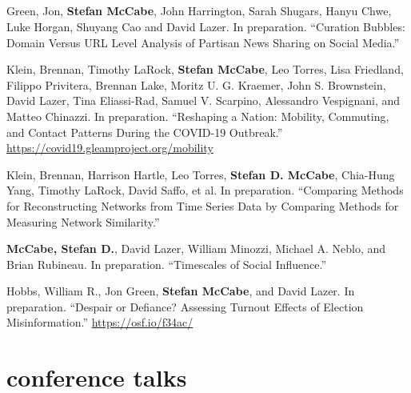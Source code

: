 \documentclass[11pt, letter]{article}
\begin{document}
\subsection*{} %
\vspace{-6mm} %
\begin{hangparas}{.25in}{1}
Green, Jon, \textbf{Stefan McCabe}, John Harrington, Sarah Shugars, Hanyu
Chwe, Luke Horgan, Shuyang Cao and David Lazer. In preparation. ``Curation
Bubbles: Domain Versus URL Level Analysis of Partisan News Sharing on Social
Media.'' \vspace{2mm}

Klein, Brennan,\textsuperscript{\textdagger} Timothy
LaRock,\textsuperscript{\textdagger} \textbf{Stefan
  McCabe},\textsuperscript{\textdagger} Leo Torres,\textsuperscript{\textdagger}
Lisa Friedland, Filippo Privitera, Brennan Lake, Moritz U. G. Kraemer, John S.
Brownstein, David Lazer, Tina Eliassi-Rad, Samuel V. Scarpino, Alessandro
Vespignani, and Matteo Chinazzi. In preparation. ``Reshaping a Nation: Mobility,
Commuting, and Contact Patterns During the COVID-19 Outbreak.''
\href{https://covid19.gleamproject.org/mobility}{https://covid19.gleamproject.org/mobility} \vspace{2mm}

Klein, Brennan, Harrison Hartle, Leo Torres, \textbf{Stefan D. McCabe},
Chia-Hung Yang, Timothy LaRock, David Saffo, et al. In preparation. ``Comparing
Methods for Reconstructing Networks from Time Series Data by Comparing Methods
for Measuring Network Similarity.'' \vspace{2mm}

\textbf{McCabe, Stefan D.}, David Lazer, William Minozzi, Michael A. Neblo, and
Brian Rubineau. In preparation. ``Timescales of Social Influence.'' \vspace{2mm}

Hobbs, William R., Jon Green, \textbf{Stefan McCabe}, and David Lazer. In
preparation. ``Despair or Defiance? Assessing Turnout Effects of Election
Misinformation.'' \href{https://osf.io/f34ac/}{ https://osf.io/f34ac/}\vspace{2mm}
\end{hangparas}

\section{conference talks}
\end{document}
